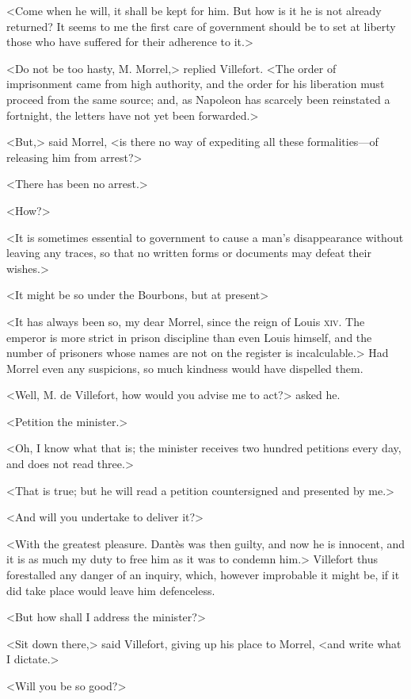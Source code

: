  <Come when he will, it shall be kept for him. But how is it he is not already returned? It seems to me the first care of government should be to set at liberty those who have suffered for their adherence to it.> 

 <Do not be too hasty, M. Morrel,> replied Villefort. <The order of imprisonment came from high authority, and the order for his liberation must proceed from the same source; and, as Napoleon has scarcely been reinstated a fortnight, the letters have not yet been forwarded.> 

 <But,> said Morrel, <is there no way of expediting all these formalities—of releasing him from arrest?> 

 <There has been no arrest.> 

 <How?> 

 <It is sometimes essential to government to cause a man's disappearance without leaving any traces, so that no written forms or documents may defeat their wishes.> 

 <It might be so under the Bourbons, but at present\longdash> 

 <It has always been so, my dear Morrel, since the reign of Louis \textsc{xiv.} The emperor is more strict in prison discipline than even Louis himself, and the number of prisoners whose names are not on the register is incalculable.> Had Morrel even any suspicions, so much kindness would have dispelled them. 

 <Well, M. de Villefort, how would you advise me to act?> asked he. 

 <Petition the minister.> 

 <Oh, I know what that is; the minister receives two hundred petitions every day, and does not read three.> 

 <That is true; but he will read a petition countersigned and presented by me.> 

 <And will you undertake to deliver it?> 

 <With the greatest pleasure. Dantès was then guilty, and now he is innocent, and it is as much my duty to free him as it was to condemn him.> Villefort thus forestalled any danger of an inquiry, which, however improbable it might be, if it did take place would leave him defenceless. 

 <But how shall I address the minister?> 

 <Sit down there,> said Villefort, giving up his place to Morrel, <and write what I dictate.> 

 <Will you be so good?> 

